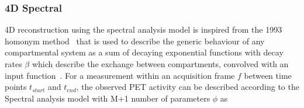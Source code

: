 \subsubsection{4D Spectral}
4D reconstruction using the spectral analysis model is inspired from the 1993 homonym method~\cite{Cunningham1993} that is used to describe the generic behaviour of any compartmental system as a sum of decaying exponential functions with decay rates $\beta$ which describe the exchange between compartments, convolved with an input function~\cite{Gunn2002}. 
For a measurement within an acquisition frame $f$ between time points $t_{start}$ and $t_{end}$, the observed PET activity can be described
according to the Spectral analysis model with M+1 number of parameters $\phi$ as

